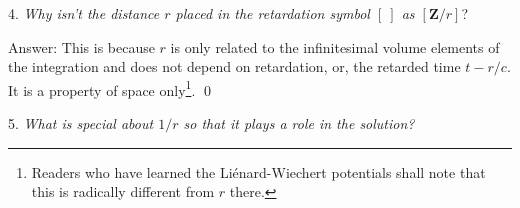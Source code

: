 \documentclass[11pt]{article}              %
\begin{document}
4. {\it Why isn't the distance $r$ placed in the retardation symbol $[\ ]$ as $[{\mathbf Z}/r]$}?

Answer: This is because $r$ is only related to the infinitesimal volume elements of the integration and does not depend on retardation, or, the retarded time $t-r/c$. It is a property of space only\footnote{Readers who have learned the Li\'{e}nard-Wiechert potentials shall note that this is radically different from $r$ there.}.
\qed



5. {\it What is special about ${\mathit 1}/r$ so that it plays a role in the solution?} 
\end{document}
